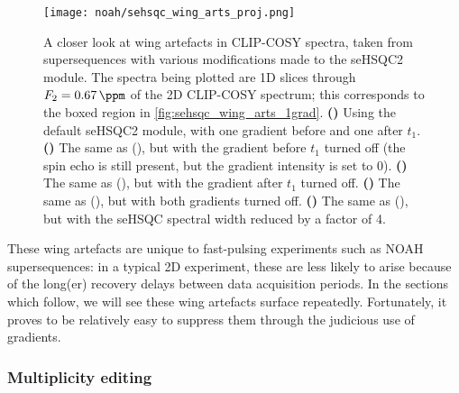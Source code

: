 \begin{figure}[!ht]
    \centering
    \texttt{[image: noah/sehsqc\_wing\_arts\_proj.png]}%
    {\label{fig:sehsqc_wing_arts_proj_onon}}%
    {\label{fig:sehsqc_wing_arts_proj_offon}}%
    {\label{fig:sehsqc_wing_arts_proj_onoff}}%
    {\label{fig:sehsqc_wing_arts_proj_offoff}}%
    {\label{fig:sehsqc_wing_arts_proj_offon_sw4}}%
    \caption[More detail about wing artefacts in CLIP-COSY spectra]{
        A closer look at wing artefacts in CLIP-COSY spectra, taken from  supersequences with various modifications made to the seHSQC2 module.
        The spectra being plotted are 1D slices through $F_2 = \qty{0.67}{\ppm}$ of the 2D CLIP-COSY spectrum; this corresponds to the boxed region in \cref{fig:sehsqc_wing_arts_1grad}.
        \textbf{()} Using the default seHSQC2 module, with one gradient before and one after $t_1$.
        \textbf{()} The same as (), but with the gradient before $t_1$ turned off (the spin echo is still present, but the gradient intensity is set to 0).
        \textbf{()} The same as (), but with the gradient after $t_1$ turned off.
        \textbf{()} The same as (), but with both gradients turned off.
        \textbf{()} The same as (), but with the seHSQC spectral width reduced by a factor of 4.
    }
    \label{fig:sehsqc_wing_arts_proj}
\end{figure}

These wing artefacts are unique to fast-pulsing experiments such as NOAH supersequences: in a typical 2D experiment, these are less likely to arise because of the long(er) recovery delays between data acquisition periods.
In the sections which follow, we will see these wing artefacts surface repeatedly.
Fortunately, it proves to be relatively easy to suppress them through the judicious use of gradients.


\subsubsection{Multiplicity editing}

